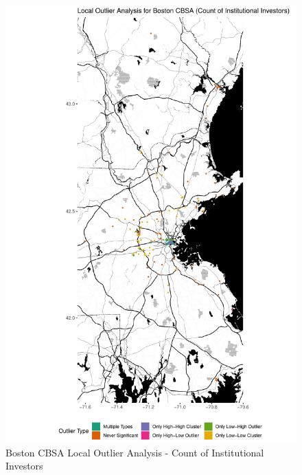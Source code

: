 \begin{figure}
	\centering
	\includegraphics[width=1\linewidth]{Figures/ChapterIV/Bos_Count_LO}
	\caption[Boston CBSA Local Outlier Analysis - Count of Institutional Investors 1999-2018]{Boston CBSA Local Outlier Analysis - Count of Institutional Investors}
	\label{fig:bostoncountlocaloutliercount}
\end{figure}

